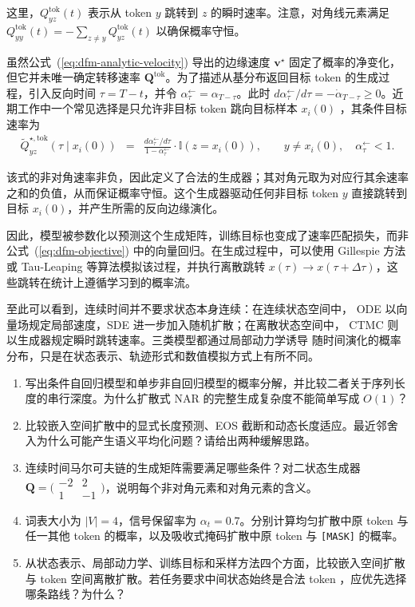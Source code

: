\noindent 这里，$Q^{\mathrm{tok}}_{yz}(t)$ 表示从 token $y$ 跳转到 $z$ 的瞬时速率。注意，对角线元素满足 $Q^{\mathrm{tok}}_{yy}(t) = - \sum_{z \neq y} Q^{\mathrm{tok}}_{yz}(t)$ 以确保概率守恒。

虽然公式~(\ref{eq:dfm-analytic-velocity}) 导出的边缘速度 $\mathbf{v}^\star$ 固定了概率的净变化，但它并未唯一确定转移速率 $\mathbf{Q}^{\mathrm{tok}}$。为了描述从基分布返回目标 token 的生成过程，引入反向时间 $\tau=T-t$，并令 $\alpha^\leftarrow_\tau=\alpha_{T-\tau}$。此时 $d\alpha^\leftarrow_\tau/d\tau=-\dot{\alpha}_{T-\tau}\geq0$。近期工作中一个常见选择是只允许非目标 token 跳向目标样本 $x_i(0)$ \citep{campbell-etal:2024generative}，其条件目标速率为
\begin{eqnarray}
\widetilde Q^{\star,\mathrm{tok}}_{yz}(\tau\mid x_i(0))
&=&
\frac{d\alpha^\leftarrow_\tau/d\tau}{1-\alpha^\leftarrow_\tau}
\cdot\mathbb{I}(z=x_i(0)),
\qquad y\ne x_i(0),\quad \alpha^\leftarrow_\tau<1.
\label{eq:target-Q}
\end{eqnarray}

\noindent 该式的非对角速率非负，因此定义了合法的生成器；其对角元取为对应行其余速率之和的负值，从而保证概率守恒。这个生成器驱动任何非目标 token $y$ 直接跳转到目标 $x_i(0)$，并产生所需的反向边缘演化。

因此，模型被参数化以预测这个生成矩阵，训练目标也变成了速率匹配损失，而非公式~(\ref{eq:dfm-objective}) 中的向量回归。在生成过程中，可以使用 Gillespie 方法 \citep{gillespie:1977exact} 或 Tau-Leaping \citep{gillespie:2001approximate} 等算法模拟该过程，并执行离散跳转 $x(\tau) \to x(\tau+\Delta \tau)$，这些跳转在统计上遵循学习到的概率流。

至此可以看到，连续时间并不要求状态本身连续：在连续状态空间中，
ODE 以向量场规定局部速度，SDE 进一步加入随机扩散；在离散状态空间中，
CTMC 则以生成器规定瞬时跳转速率。三类模型都通过局部动力学诱导
随时间演化的概率分布，只是在状态表示、轨迹形式和数值模拟方式上有所不同。

\begin{exercisebox}
  \begin{enumerate}
    \item 写出条件自回归模型和单步非自回归模型的概率分解，并比较二者关于序列长度的串行深度。为什么扩散式 NAR 的完整生成复杂度不能简单写成 \(O(1)\)？
    \item 比较嵌入空间扩散中的显式长度预测、EOS 截断和动态长度适应。最近邻舍入为什么可能产生语义平均化问题？请给出两种缓解思路。
    \item 连续时间马尔可夫链的生成矩阵需要满足哪些条件？对二状态生成器 \(\boldsymbol Q=\bigl(\begin{smallmatrix}-2&2\\1&-1\end{smallmatrix}\bigr)\)，说明每个非对角元素和对角元素的含义。
    \item 词表大小为 \(|V|=4\)，信号保留率为 \(\alpha_t=0.7\)。分别计算均匀扩散中原 token 与任一其他 token 的概率，以及吸收式掩码扩散中原 token 与 \texttt{[MASK]} 的概率。
    \item 从状态表示、局部动力学、训练目标和采样方法四个方面，比较嵌入空间扩散与 token 空间离散扩散。若任务要求中间状态始终是合法 token ，应优先选择哪条路线？为什么？
  \end{enumerate}
\end{exercisebox}

